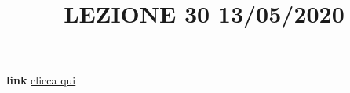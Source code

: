 \newline
\newline
\title{LEZIONE 30 13/05/2020}\newline
\textbf{link} \href{https://web.microsoftstream.com/video/1a054ac2-ce88-458b-8763-87e3b12e25dd?list=user&userId=faa91214-a6f5-40d7-8875-253fd49b8ce1}{clicca qui}
